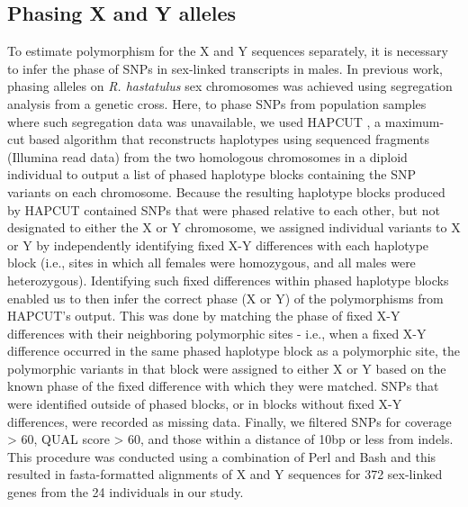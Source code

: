 \documentclass[9pt,twocolumn,twoside]{gsajnl}
\begin{document}
\subsection*{Phasing X and Y alleles}
To estimate polymorphism for the X and Y sequences separately, it is necessary to infer the phase of SNPs in sex-linked transcripts in males. In previous work, phasing alleles on \textit{R. hastatulus} sex chromosomes was achieved using segregation analysis from a genetic cross. Here, to phase SNPs from population samples where such segregation data was unavailable, we used HAPCUT \citep{bansal2008hapcut}, a maximum-cut based algorithm that reconstructs haplotypes using sequenced fragments (Illumina read data) from the two homologous chromosomes in a diploid individual to output a list of phased haplotype blocks containing the SNP variants on each chromosome. Because the resulting haplotype blocks produced by HAPCUT contained SNPs that were phased relative to each other, but not designated to either the X or Y chromosome, we assigned individual variants to X or Y by independently identifying fixed X-Y differences with each haplotype block (i.e., sites in which all females were homozygous, and all males were heterozygous). Identifying such fixed differences within phased haplotype blocks enabled us to then infer the correct phase (X or Y) of the polymorphisms from HAPCUT’s output. This was done by matching the phase of fixed X-Y differences with their neighboring polymorphic sites - i.e., when a fixed X-Y difference occurred in the same phased haplotype block as a polymorphic site, the polymorphic variants in that block were assigned to either X or Y based on the known phase of the fixed difference with which they were matched. SNPs that were identified outside of phased blocks, or in blocks without fixed X-Y differences, were recorded as missing data. Finally, we filtered SNPs for coverage > 60, QUAL score > 60, and those within a distance of 10bp or less from indels. This procedure was conducted using a combination of Perl and Bash and this resulted in fasta-formatted alignments of X and Y sequences for 372 sex-linked genes from the 24 individuals in our study.
\end{document}
